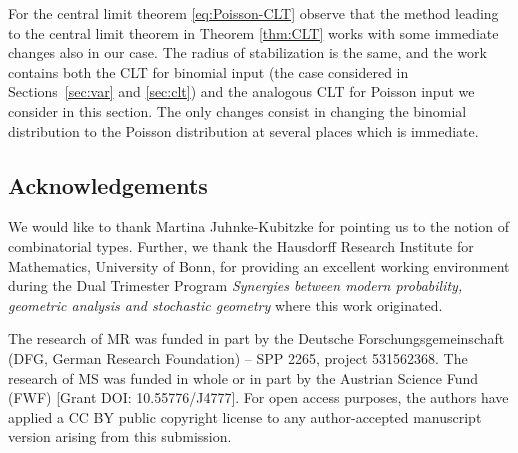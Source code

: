 \documentclass[12pt]{article}
\theoremstyle{definition}
\begin{document}
For the central limit theorem \eqref{eq:Poisson-CLT} observe that the method leading to the central limit theorem in Theorem \ref{thm:CLT} works with some immediate changes also in our case. The radius of stabilization is the same, and the work \cite[Cor.2.2]{LachSchulteYukich} contains both the CLT for binomial input (the case considered in Sections~\ref{sec:var} and \ref{sec:clt}) and the analogous CLT for Poisson input we consider in this section. The only changes consist in changing the binomial distribution to the Poisson distribution at several places which is immediate.


\subsection*{Acknowledgements}

We would like to thank Martina Juhnke-Kubitzke for pointing us to the notion of combinatorial types. Further, we thank the Hausdorff Research Institute for Mathematics, University of Bonn, for providing an
excellent working environment during the Dual Trimester Program \textit{Synergies between modern probability, geometric analysis and stochastic geometry} where this work originated.

The research of MR was funded in part by the Deutsche Forschungsgemeinschaft (DFG, German Research Foundation) -- SPP 2265, project 531562368. The research of MS was funded in whole or in part by the Austrian Science Fund (FWF) [Grant DOI: 10.55776/J4777]. For open access purposes, the authors have applied a CC BY public copyright license to any author-accepted manuscript version arising from this submission. 



\end{document}
